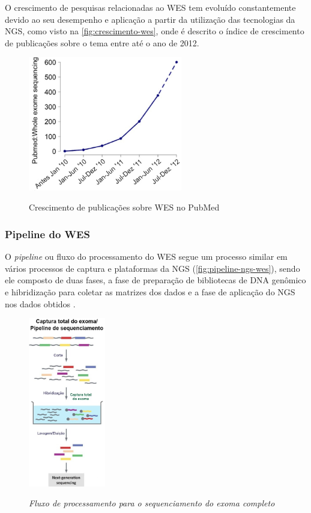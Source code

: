 O crescimento de pesquisas relacionadas ao WES tem evoluído constantemente devido ao seu desempenho e aplicação a partir da utilização das tecnologias da NGS, como visto na \autoref{fig:crescimento-wes}, onde é descrito o índice de crescimento de publicações sobre o tema entre até o ano de 2012.

\begin{figure}[!htb]
    \centering
    \caption{Crescimento de publicações sobre WES no PubMed}
    \includegraphics[width=0.6\textwidth]{./dados/figuras/crescimento-wes}
    \label{fig:crescimento-wes}
\end{figure}

\subsubsection{Pipeline do WES}

O \textit{pipeline} ou fluxo do processamento do WES segue um processo similar em vários processos de captura e plataformas da NGS (\autoref{fig:pipeline-ngs-wes}), sendo ele composto de duas fases, a fase de preparação de bibliotecas de DNA genômico e hibridização para coletar as matrizes dos dados e a fase de aplicação do NGS nos dados obtidos \cite{Goh2013}.

\begin{figure}[!htb]
\centering
\caption{\textit{Fluxo de processamento para o sequenciamento do exoma completo}}
\includegraphics[width=0.3\textwidth]{./dados/figuras/pipeline-ngs-wes}
\label{fig:pipeline-ngs-wes}
\end{figure}

